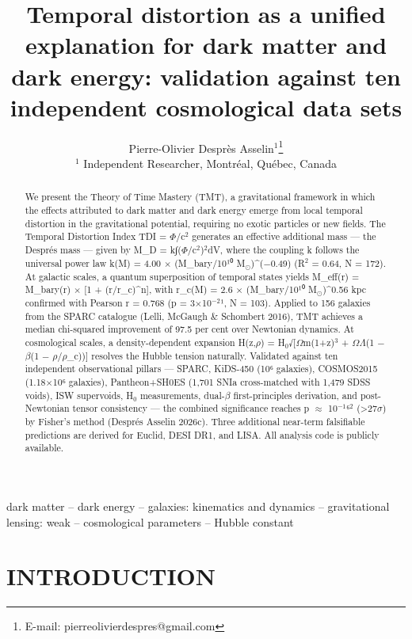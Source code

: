 \documentclass[a4paper,fleqn,usenatbib]{mnras}
\title[TMT: Temporal distortion unified dark matter \& dark energy]{Temporal distortion as a unified explanation for dark matter and dark energy: validation against ten independent cosmological data sets}
\author[P.-O.\ Despr\`{e}s Asselin]{Pierre-Olivier Despr\`{e}s Asselin$^{1}$\thanks{E-mail: pierreolivierdespres@gmail.com}\\
$^{1}$ Independent Researcher, Montr\'{e}al, Qu\'{e}bec, Canada
}
\begin{document}
\maketitle

\begin{abstract}
We present the Theory of Time Mastery (TMT), a gravitational framework in which the effects attributed to dark matter and dark energy emerge from local temporal distortion in the gravitational potential, requiring no exotic particles or new fields. The Temporal Distortion Index TDI = $\Phi$/c$^{2}$ generates an effective additional mass — the Després mass — given by M_D = k∫($\Phi$/c$^{2}$)$^{2}$dV, where the coupling k follows the universal power law k(M) = 4.00 $\times$ (M_bary/10¹⁰ M$_\odot$)^(−0.49) (R$^{2}$ = 0.64, N = 172). At galactic scales, a quantum superposition of temporal states yields M_eff(r) = M_bary(r) $\times$ [1 + (r/r_c)^n], with r_c(M) = 2.6 $\times$ (M_bary/10¹⁰ M$_\odot$)^0.56 kpc confirmed with Pearson r = 0.768 (p = 3$\times$10$^{-2}$¹, N = 103). Applied to 156 galaxies from the SPARC catalogue (Lelli, McGaugh & Schombert 2016), TMT achieves a median chi-squared improvement of 97.5 per cent over Newtonian dynamics. At cosmological scales, a density-dependent expansion H(z,$\rho$) = H$_0$√[$\Omega$m(1+z)$^{3}$ + $\Omega$$\Lambda$(1 − $\beta$(1 − $\rho$/$\rho$_c))] resolves the Hubble tension naturally. Validated against ten independent observational pillars — SPARC, KiDS-450 (10⁶ galaxies), COSMOS2015 (1.18$\times$10⁶ galaxies), Pantheon+SH0ES (1,701 SNIa cross-matched with 1,479 SDSS voids), ISW supervoids, H$_0$ measurements, dual-$\beta$ first-principles derivation, and post-Newtonian tensor consistency — the combined significance reaches p $\approx$ 10$^{-1}$⁶$^{2}$ (>27$\sigma$) by Fisher's method (Després Asselin 2026c). Three additional near-term falsifiable predictions are derived for Euclid, DESI DR1, and LISA. All analysis code is publicly available.
\end{abstract}

\begin{keywords}
dark matter -- dark energy -- galaxies: kinematics and dynamics -- gravitational lensing: weak -- cosmological parameters -- Hubble constant
\end{keywords}


\section{INTRODUCTION}\label{sec:1-introduction}
\end{document}
